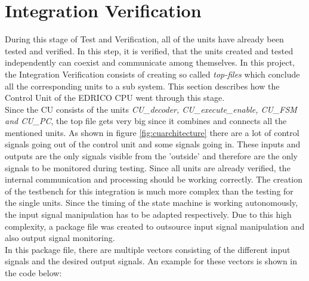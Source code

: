 \section{Integration Verification}
During this stage of Test and Verification, all of the units have already been tested and verified. In this step, it is verified, that the units created and tested independently can coexist and communicate among themselves. In this project, the Integration Verification consists of creating so called \textit{top-files} which conclude all the corresponding units to a sub system. This section describes how the Control Unit of the EDRICO CPU went through this stage.\\
Since the CU consists of the units \textit{CU\_decoder, CU\_execute\_enable, CU\_FSM and CU\_PC}, the top file gets very big since it combines and connects all the mentioned units. As shown in figure \ref{fig:cuarchitecture} there are a lot of control signals going out of the control unit and some signals going in. These inputs and outputs are the only signals visible from the 'outside' and therefore are the only signals to be monitored during testing. Since all units are already verified, the internal communication and processing should be working correctly. The creation of the testbench for this integration is much more complex than the testing for the single units. Since the timing of the state machine is working autonomously, the input signal manipulation has to be adapted respectively. Due to this high complexity, a package file was created to outsource input signal manipulation and also output signal monitoring.\\
In this package file, there are multiple vectors consisting of the different input signals and the desired output signals. An example for these vectors is shown in the code below:
